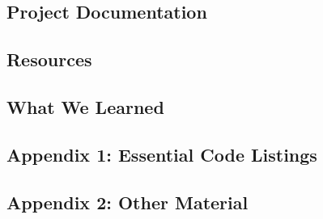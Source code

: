 \documentclass[letterpaper,10pt,titlepage]{article}
\begin{document}
\subsection*{Project Documentation}

\subsection*{Resources}

\subsection*{What We Learned}

\subsection*{Appendix 1: Essential Code Listings}

\subsection*{Appendix 2: Other Material}
\end{document}
